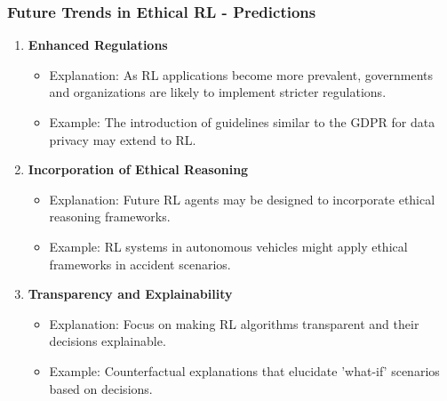 \documentclass{beamer}
\begin{document}
\begin{frame}[fragile]
    \frametitle{Future Trends in Ethical RL - Predictions}
    \begin{enumerate}
        \item \textbf{Enhanced Regulations}
            \begin{itemize}
                \item Explanation: As RL applications become more prevalent, governments and organizations are likely to implement stricter regulations.
                \item Example: The introduction of guidelines similar to the GDPR for data privacy may extend to RL.
            \end{itemize}
        
        \item \textbf{Incorporation of Ethical Reasoning}
            \begin{itemize}
                \item Explanation: Future RL agents may be designed to incorporate ethical reasoning frameworks.
                \item Example: RL systems in autonomous vehicles might apply ethical frameworks in accident scenarios.
            \end{itemize}

        \item \textbf{Transparency and Explainability}
            \begin{itemize}
                \item Explanation: Focus on making RL algorithms transparent and their decisions explainable.
                \item Example: Counterfactual explanations that elucidate 'what-if' scenarios based on decisions.
            \end{itemize}
    \end{enumerate}
\end{frame}
\end{document}
